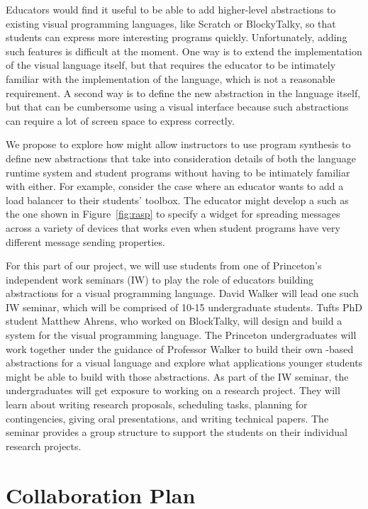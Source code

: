 Educators would find it useful to be able to add higher-level abstractions
to existing visual programming languages, like Scratch or BlockyTalky,
so that students can express more interesting programs quickly.
Unfortunately, adding such features is
difficult at the moment\cite{ScratchExt}. One way is to extend the implementation of
the visual language itself, but that requires the educator to be
intimately familiar with the implementation of the language, which is
not a reasonable requirement.  A second way is to define the new
abstraction in the language itself, but that can be cumbersome using a
visual interface because such abstractions can require a lot of screen
space to express correctly.

We propose to explore how \rasps might allow instructors to use
program synthesis to define new abstractions that take into
consideration details of both the language runtime system and student
programs without having to be intimately familiar with either.  For
example, consider the case where an educator wants to add a load
balancer to their students' toolbox.  The educator might develop a
\rasp such as the one shown in Figure~\ref{fig:rasp} to specify a
widget for spreading messages across a variety of devices that works
even when student programs have very different message sending
properties.

For this part of our project, we will use students from one of
Princeton's independent work seminars (IW) to play the role of
educators building abstractions for a visual programming language.
David Walker will lead one such IW seminar, which will be comprised of 10-15
undergraduate students.  Tufts PhD student Matthew Ahrens, who worked
on BlockTalky, will design and build a \rasp system for the visual
programming language.  The Princeton undergraduates will work together
under the guidance of Professor Walker to build their own \rasp-based
abstractions for a visual language and explore what applications
younger students might be able to build with those abstractions.
As part of the IW seminar, the undergraduates will get exposure to
working on a research project.  They will learn about writing research
proposals, scheduling tasks, planning for contingencies, giving oral
presentations, and writing technical papers.  The seminar provides a
group structure to support the students on their individual research projects.

\section{Collaboration Plan}
\label{sec:collab}

